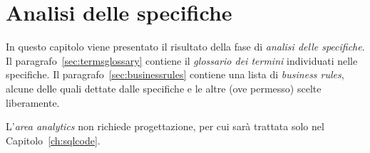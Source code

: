 \chapter{Analisi delle specifiche}
In questo capitolo viene presentato il risultato della fase di {\it analisi delle specifiche}. Il
paragrafo~\ref{sec:termsglossary} contiene il {\it glossario dei termini} individuati
nelle specifiche.%
Il paragrafo~\ref{sec:businessrules} contiene una lista di {\it business rules},
alcune delle quali dettate dalle specifiche e le altre (ove permesso) scelte liberamente.

L'{\it area analytics} non richiede progettazione, per cui sarà trattata solo nel
Capitolo~\ref{ch:sqlcode}.


